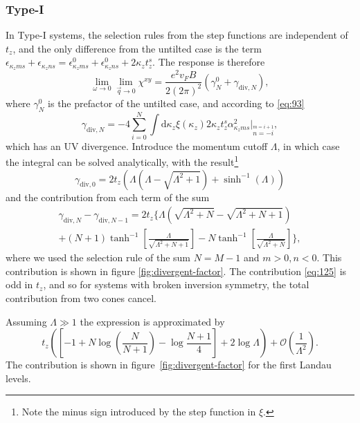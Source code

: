 \subsubsection{Type-I}
In Type-I systems, the selection rules from the step functions are independent of \( t_z \), and the only difference from the untilted case is the term \( \epsilon_{\kappa_z m s} + \epsilon_{\kappa_z n s} = \epsilon^0_{\kappa_z m s} + \epsilon^0_{\kappa_z n s} + 2 \kappa_z t^s_z \).
The response is therefore
\begin{equation}
  \label{eq:122}
  \lim_{\omega \to 0} \lim_{\vec{q} \to 0} \chi^{xy} = \frac{e^2v_F B}{2 (2\pi)^2} (\gamma_N^0 + \gamma_{\text{div}, N}),
\end{equation}
where \( \gamma_N^0 \) is the prefactor of the untilted case, and according to \cref{eq:93}
\begin{equation}
  \label{eq:123}
  \gamma_{\text{div}, N} = -4 \sum\limits_{i=0}^{N} \int \mathrm{d} \kappa_z \xi(\kappa_z)
  2 \kappa_z t^s_z \alpha_{\kappa_z m s}^2 \Big|_{\overset{m=i+1}{n=-i}},
\end{equation}
which has an UV divergence.
Introduce the momentum cutoff \( \Lambda \), in which case the integral can be solved analytically, with the result\footnote{Note the minus sign introduced by the step function in \( \xi \).}
\begin{equation}
  \label{eq:124}
  \gamma_{\text{div}, 0} = 2 t_z \left(\Lambda  \left(\Lambda -\sqrt{\Lambda ^2+1}\right)+\sinh ^{-1}(\Lambda
   )\right)
\end{equation}
and the contribution from each term of the sum
\begin{multline}
  \gamma_{\text{div}, N} - \gamma_{\text{div}, N-1} =
  2 t_z
  \Bigg\{
    \Lambda\left(\sqrt{\Lambda^2 + N} - \sqrt{\Lambda^2 + N + 1}  \right)\\
    + (N + 1) \tanh^{-1}\left[\frac{\Lambda}{\sqrt{\Lambda^2 + N + 1} } \right]
    - N \tanh^{-1}\left[\frac{\Lambda}{\sqrt{\Lambda^2 + N}}\right]
    \Bigg\},
    \label{eq:125}
\end{multline}
where we used the selection rule of the sum \( N = M - 1 \) and \( m>0, n<0 \).
This contribution is shown in figure \ref{fig:divergent-factor}.
The contribution \eqref{eq:125} is odd in \( t_z \), and so for systems with broken inversion symmetry, the total contribution from two cones cancel.

Assuming \( \Lambda \gg 1 \) the expression is approximated by
\begin{equation}
  \label{eq:126}
  t_z
  \left(
    \left[
  -1 + N \log\left(\frac{N}{N+1}\right) - \log \frac{N+1}{4}
  \right]
 + 2 \log\Lambda
\right) + \mathcal{O}\left(\frac{1}{\Lambda^2}\right).
\end{equation}
The contribution is shown in figure~\ref{fig:divergent-factor} for the first Landau levels.




